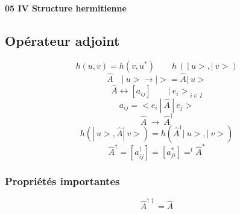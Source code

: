 
{\bf 05 IV Structure hermitienne}

\subsection{Opérateur adjoint} %
\[
h(u,v)=h(v,u^*) \qquad h\,(\,|\ u>,|\ v>)
\]
\[
\widehat A \quad |\ u> \to |>=\widehat A|\ u>
\]
\[
\widehat A \leftrightarrow [a_{ij}] \qquad {|\ e_i>}_{i\in I}
\]
\[
a_{ij} = <e_i\ |\ \widehat A\ |\ e_j>
\]
\[
\widehat A\ \to\ \widehat A ^\dagger
\]
\[
h(|\ u>,\widehat A|\ v>) = h(\widehat A^\dagger|\ u>,|\ v>)
\]
\[
\widehat A^\dagger = [a_{ij}^\dagger] = [a_{ji}^*] = ^t\widehat A^*
\]

\subsubsection{Propriétés importantes}
\[
\widehat A^{\dagger \dagger} = \widehat A
\]

